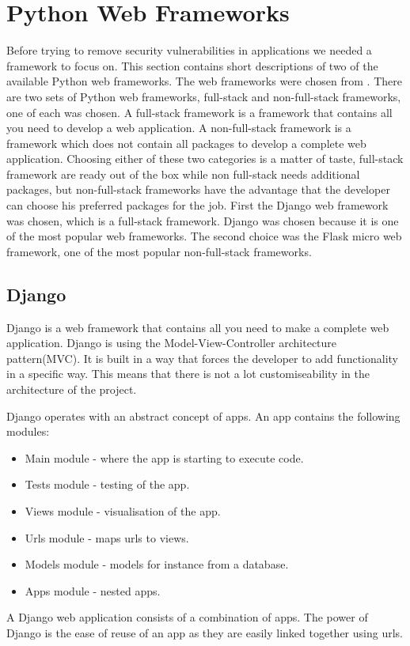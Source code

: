 \section{Python Web Frameworks}
Before trying to remove security vulnerabilities in applications we needed a framework to focus on.
This section contains short descriptions of two of the available Python web frameworks.
The web frameworks were chosen from \citet{python_web_frameworks_list}.
There are two sets of Python web frameworks, full-stack and non-full-stack frameworks, one of each was chosen.
A full-stack framework is a framework that contains all you need to develop a web application.
A non-full-stack framework is a framework which does not contain all packages to develop a complete web application.
Choosing either of these two categories is a matter of taste, full-stack framework are ready out of the box while non full-stack needs additional packages, but non-full-stack frameworks have the advantage that the developer can choose his preferred packages for the job.
First the Django web framework was chosen, which is a full-stack framework.
Django was chosen because it is one of the most popular web frameworks.
The second choice was the Flask micro web framework, one of the most popular non-full-stack frameworks.

\subsection{Django}
Django\cite{django_cite} is a web framework that contains all you need to make a complete web application.
Django is using the Model-View-Controller architecture pattern(MVC)\cite{leff2001web}.
It is built in a way that forces the developer to add functionality in a specific way.
This means that there is not a lot customiseability in the architecture of the project.

Django operates with an abstract concept of apps.
An app contains the following modules:
\begin{itemize}
\item Main module - where the app is starting to execute code.
\item Tests module - testing of the app.
\item Views module - visualisation of the app.
\item Urls module - maps urls to views.
\item Models module - models for instance from a database.
\item Apps module - nested apps.
\end{itemize}
A Django web application consists of a combination of apps.
The power of Django is the ease of reuse of an app as they are easily linked together using urls.

